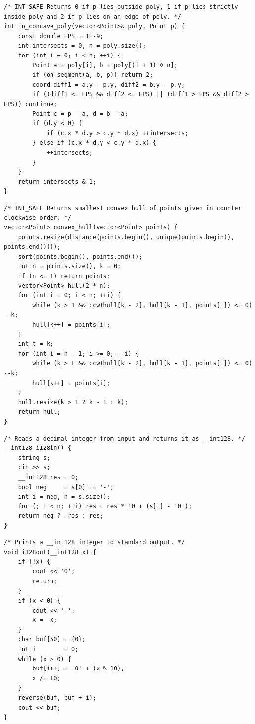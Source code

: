 \documentclass[a4paper,10pt]{article}
\newenvironment{keepfunction}{\begin{samepage}}{\end{samepage}}
\begin{document}
\begin{keepfunction}
\begin{verbatim}
/* INT_SAFE Returns 0 if p lies outside poly, 1 if p lies strictly inside poly and 2 if p lies on an edge of poly. */
int in_concave_poly(vector<Point>& poly, Point p) {
    const double EPS = 1E-9;
    int intersects = 0, n = poly.size();
    for (int i = 0; i < n; ++i) {
        Point a = poly[i], b = poly[(i + 1) % n];
        if (on_segment(a, b, p)) return 2;
        coord diff1 = a.y - p.y, diff2 = b.y - p.y;
        if ((diff1 <= EPS && diff2 <= EPS) || (diff1 > EPS && diff2 > EPS)) continue;
        Point c = p - a, d = b - a;
        if (d.y < 0) {
            if (c.x * d.y > c.y * d.x) ++intersects;
        } else if (c.x * d.y < c.y * d.x) {
            ++intersects;
        }
    }
    return intersects & 1;
}
\end{verbatim}
\end{keepfunction}

\begin{keepfunction}
\begin{verbatim}
/* INT_SAFE Returns smallest convex hull of points given in counter clockwise order. */
vector<Point> convex_hull(vector<Point> points) {
    points.resize(distance(points.begin(), unique(points.begin(), points.end())));
    sort(points.begin(), points.end());
    int n = points.size(), k = 0;
    if (n <= 1) return points;
    vector<Point> hull(2 * n);
    for (int i = 0; i < n; ++i) {
        while (k > 1 && ccw(hull[k - 2], hull[k - 1], points[i]) <= 0) --k;
        hull[k++] = points[i];
    }
    int t = k;
    for (int i = n - 1; i >= 0; --i) {
        while (k > t && ccw(hull[k - 2], hull[k - 1], points[i]) <= 0) --k;
        hull[k++] = points[i];
    }
    hull.resize(k > 1 ? k - 1 : k);
    return hull;
}
\end{verbatim}
\end{keepfunction}

\begin{keepfunction}
\begin{verbatim}
/* Reads a decimal integer from input and returns it as __int128. */
__int128 i128in() {
    string s;
    cin >> s;
    __int128 res = 0;
    bool neg     = s[0] == '-';
    int i = neg, n = s.size();
    for (; i < n; ++i) res = res * 10 + (s[i] - '0');
    return neg ? -res : res;
}
\end{verbatim}
\end{keepfunction}

\begin{keepfunction}
\begin{verbatim}
/* Prints a __int128 integer to standard output. */
void i128out(__int128 x) {
    if (!x) {
        cout << '0';
        return;
    }
    if (x < 0) {
        cout << '-';
        x = -x;
    }
    char buf[50] = {0};
    int i        = 0;
    while (x > 0) {
        buf[i++] = '0' + (x % 10);
        x /= 10;
    }
    reverse(buf, buf + i);
    cout << buf;
}
\end{verbatim}
\end{keepfunction}
\end{document}

